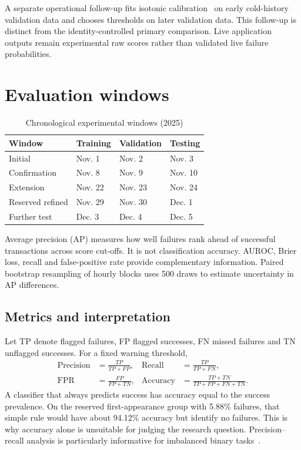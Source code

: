 \documentclass[12pt,a4paper,oneside]{report}
\begin{document}
A separate operational follow-up fits isotonic calibration~\cite{isotonic,niculescu} on early cold-history validation data and chooses thresholds on later validation data. This follow-up is distinct from the identity-controlled primary comparison. Live application outputs remain experimental raw scores rather than validated live failure probabilities.
\section{Evaluation windows}
\begin{table}[ht]\centering\caption{Chronological experimental windows (2025)}
\begin{tabular}{llll}\toprule Window&Training&Validation&Testing\\\midrule Initial&Nov. 1&Nov. 2&Nov. 3\\Confirmation&Nov. 8&Nov. 9&Nov. 10\\Extension&Nov. 22&Nov. 23&Nov. 24\\Reserved refined&Nov. 29&Nov. 30&Dec. 1\\Further test&Dec. 3&Dec. 4&Dec. 5\\\bottomrule\end{tabular}\end{table}
Average precision (AP) measures how well failures rank ahead of successful transactions across score cut-offs. It is not classification accuracy. AUROC, Brier loss, recall and false-positive rate provide complementary information. Paired bootstrap resampling of hourly blocks uses 500 draws to estimate uncertainty in AP differences.

\subsection{Metrics and interpretation}
Let TP denote flagged failures, FP flagged successes, FN missed failures and TN unflagged successes. For a fixed warning threshold,
\begin{align}
\mathrm{Precision}&=\frac{TP}{TP+FP}, &\mathrm{Recall}&=\frac{TP}{TP+FN},\\
\mathrm{FPR}&=\frac{FP}{FP+TN}, &\mathrm{Accuracy}&=\frac{TP+TN}{TP+FP+FN+TN}.
\end{align}
A classifier that always predicts success has accuracy equal to the success prevalence. On the reserved first-appearance group with 5.88\% failures, that simple rule would have about 94.12\% accuracy but identify no failures. This is why accuracy alone is unsuitable for judging the research question. Precision--recall analysis is particularly informative for imbalanced binary tasks~\cite{saito}.
\end{document}
